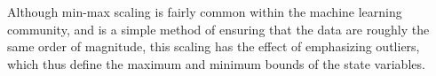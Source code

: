 \begin{enumerate}
	Although min-max scaling is fairly common within the machine learning community, and is a simple method of ensuring that the data are roughly the same order of magnitude, this scaling has the effect of emphasizing outliers, which thus define the maximum and minimum bounds of the state variables.
\end{enumerate}
